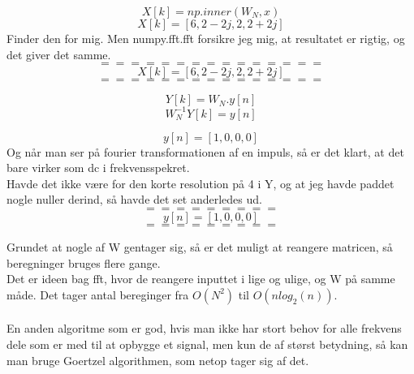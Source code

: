 \begin{EksamensOpgaver}
\begin{Eksamenssæt}[2022]
\begin{eksamensOpgave}[DFT ]
\begin{UnderOpgave}[Beregn \text{$W_N$} for N = 4 og beregn derefter DFT transformationen af signalet]
                \[X[k] = np.inner(W_N, x)\]
                \[X[k] = [6, 2 - 2j, 2 , 2 + 2j]\]
                Finder den for mig. 
                Men numpy.fft.fft forsikre jeg mig, at resultatet er rigtig, og det giver det samme. 
                \[===============\]
                \[X[k] = [6, 2 - 2j, 2 , 2 + 2j]\]
                \[===============\]
            \end{UnderOpgave}
            \[Y[k] = W_N . y[n]\]
            \[W_N^{-1}Y[k] = y[n]\]
            \begin{UnderOpgave}
                \[y[n] = [1, 0, 0, 0]\]
                Og når man ser på fourier transformationen af en impuls, så er det klart, at det bare virker som dc i frekvensspekret.\\
                Havde det ikke være for den korte resolution på 4 i Y, og at jeg havde paddet nogle nuller derind, så havde det set anderledes ud. 
                \[=========\]
                \[y[n] = [1, 0, 0, 0]\]
                \[=========\]
            \end{UnderOpgave}
            \begin{UnderOpgave}
                Grundet at nogle af W gentager sig, så er det muligt at reangere matricen, så beregninger bruges flere gange. \\
                Det er ideen bag fft, hvor de reangere inputtet i lige og ulige, og W på samme måde. 
                Det tager antal bereginger fra $O(N^2)$ til $O(n log_2(n))$. \\\\
                En anden algoritme som er god, hvis man ikke har stort behov for alle frekvens dele som er med til at opbygge et signal, men kun de af størst betydning,
                så kan man bruge Goertzel algorithmen, som netop tager sig af det. 
            \end{UnderOpgave}
        \end{eksamensOpgave}
    \end{Eksamenssæt}
    \begin{Eksamenssæt}[2022 - Forbedringer]
        \begin{eksamensOpgave}
        

\end{eksamensOpgave}
\end{Eksamenssæt}
\end{EksamensOpgaver}
